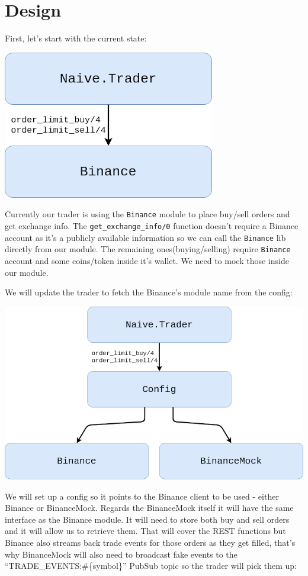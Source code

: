 \documentclass[
  oneside]{book}
\begin{document}
\hypertarget{design-1}{%
\section{Design}\label{design-1}}

First, let's start with the current state:

\includegraphics{images/chapter_04_01_current_state.png}

Currently our trader is using the \texttt{Binance} module to place buy/sell
orders and get exchange info.
The \texttt{get\_exchange\_info/0} function doesn't require a Binance account as it's a publicly available information so we can call the \texttt{Binance} lib directly from our module.
The remaining ones(buying/selling) require \texttt{Binance} account and some coins/token inside it's wallet. We need to mock those inside our module.

We will update the trader to fetch the Binance's module name from the config:

\includegraphics{images/chapter_04_02_proposal.png}

We will set up a config so it points to the Binance client to be used - either Binance or BinanceMock. Regards the BinanceMock itself it will have the same interface as the Binance module.
It will need to store both buy and sell orders and it will allow us to retrieve them. That will cover the REST functions but Binance also streams back trade events for those orders as they get filled, that's why BinanceMock will also need to broadcast fake events to the ``TRADE\_EVENTS:\#\{symbol\}'' PubSub topic so the trader will pick them up:
\end{document}
